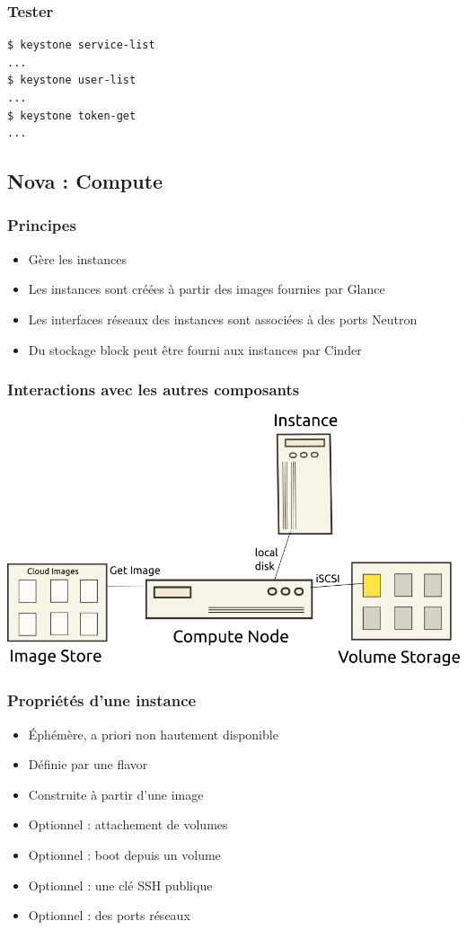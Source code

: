   \begin{frame}[containsverbatim]
    \frametitle{Tester}
\begin{verbatim}
$ keystone service-list
...
$ keystone user-list
...
$ keystone token-get
...
\end{verbatim}
  \end{frame}

  \subsection[Nova]{Nova : Compute}

  \begin{frame}
    \frametitle{Principes}
    \begin{itemize}
      \item Gère les instances
      \item Les instances sont créées à partir des images fournies par Glance
      \item Les interfaces réseaux des instances sont associées à des ports Neutron
      \item Du stockage block peut être fourni aux instances par Cinder
    \end{itemize}
  \end{frame}

  \begin{frame}
    \frametitle{Interactions avec les autres composants}
    \includegraphics[width=\textwidth]{images/compute-node.png}
  \end{frame}

  \begin{frame}
    \frametitle{Propriétés d'une instance}
    \begin{itemize}
      \item Éphémère, a priori non hautement disponible
      \item Définie par une flavor
      \item Construite à partir d'une image
      \item Optionnel : attachement de volumes
      \item Optionnel : boot depuis un volume
      \item Optionnel : une clé SSH publique
      \item Optionnel : des ports réseaux
    \end{itemize}
  \end{frame}

